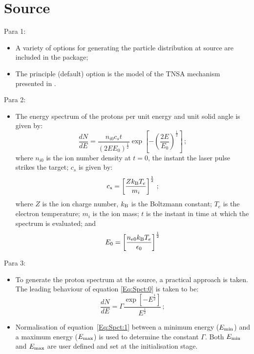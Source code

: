 \graphicspath{ {03-Source/Figures/} }

\section{Source}

Para 1:
\begin{itemize}
  \item A variety of options for generating the particle distribution
    at source are included in the package;
  \item The principle (default) option is the model of the TNSA
    mechanism presented in \cite{PhysRevLett.90.185002}.
\end{itemize}

Para 2:
\begin{itemize}
  \item The energy spectrum of the protons per unit energy and unit
    solid angle is given by:
    \begin{equation}
      \frac{dN}{dE} = \frac{n_{i0}c_st}{(2EE_0)^{\frac{1}{2}}}
                         \exp\left[
                   -\left( \frac{2E}{E_0} \right)^{\frac{1}{2}} \right]\, ;
      \label{Eq:Spct:0}
    \end{equation}
    where $n_{i0}$ is the ion number density at $t=0$, the instant the
    laser pulse strikes the target; $c_s$ is given by:
    \begin{equation}
      c_s = \left[ \frac{Z k_{\rm B} T_e}{m_i} \right]^{\frac{1}{2}} \, ;
    \end{equation}
    where $Z$ is the ion charge number, $k_{\rm B}$ is the Boltzmann
    constant; $T_e$ is the electron temperature; $m_i$ is the ion mass;
    $t$ is the instant in time at which the spectrum is evaluated; and
    \begin{equation}
      E_0 = \left[ \frac{n_{e0} k_{\rm B} T_e}{\epsilon_0} \right]^{\frac{1}{2}}
    \end{equation}
\end{itemize}

Para 3:
\begin{itemize}
  \item To generate the proton spectrum at the source, a practical
    approach is taken.
    The leading behaviour of equation \ref{Eq:Spct:0} is taken to be:
    \begin{equation}
      \frac{dN}{dE} = \Gamma
        \frac{\exp\left[ -E^{\frac{1}{2}} \right]}{E^{\frac{1}{2}}}\, ;
      \label{Eq:Spct:1}
    \end{equation}
  \item Normalisation of equation~\ref{Eq:Spct:1} between a minimum
    energy ($E_{\rm min}$) and a maximum energy ($E_{\rm max}$) is
    used to determine the constant $\Gamma$.
    Both $E_{\rm min}$ and $E_{\rm max}$ are user defined and set at
    the initialisation stage.
\end{itemize}
